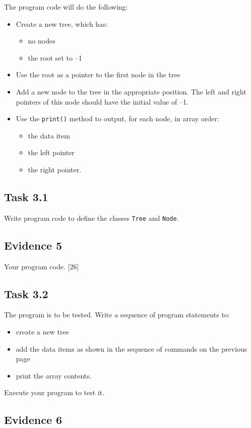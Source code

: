 The program code will do the following:
\begin{itemize}
\item Create a new tree, which has: 
\begin{itemize}
\item no nodes 
\item the root set to --1 
\end{itemize}
\item Use the root as a pointer to the first node in the tree
\item Add a new node to the tree in the appropriate position. The left and
right pointers of this node should have the initial value of --1. 
\item Use the \texttt{print()} method to output, for each node, in array
order: 
\begin{itemize}
\item the data item
\item the left pointer 
\item the right pointer.
\end{itemize}
\end{itemize}

\subsection*{Task 3.1 }

Write program code to define the classes \texttt{Tree} and \texttt{Node}.

\subsection*{Evidence 5}

Your program code. \hfill{}{[}26{]}

\subsection*{Task 3.2}

The program is to be tested. Write a sequence of program statements
to:
\begin{itemize}
\item create a new tree 
\item add the data items as shown in the sequence of commands on the previous
page 
\item print the array contents.
\end{itemize}
Execute your program to test it.

\subsection*{Evidence 6 }

